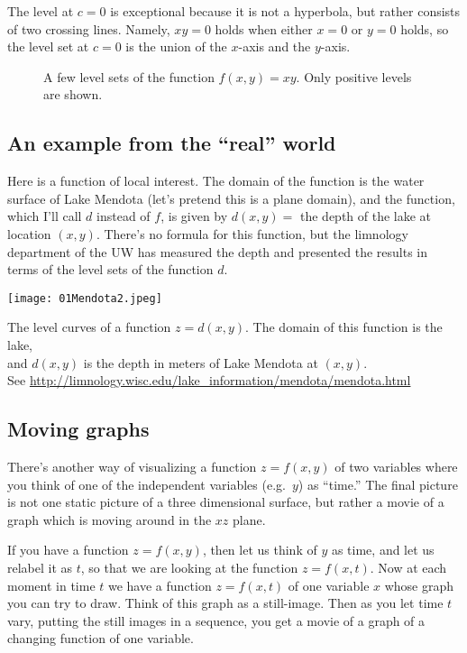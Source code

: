 The level at $c=0$ is exceptional because it is not a hyperbola, but
rather consists of two crossing lines.  Namely, $xy=0$ holds when
either $x=0$ or $y=0$ holds, so the level set at $c=0$ is the union of
the $x$-axis and the $y$-axis.

\begin{figure}[htb]
  \begin{center}
    
  \end{center}
  \caption{A few level sets of the function $f(x, y) = xy$.  Only
  positive levels are shown.  }
  \label{fig:saddlelevels}
\end{figure}


\subsection{An example from the ``real'' world} %
\label{sec:01mendotaexample}  Here is a function of local interest.
The domain of the function is the water surface of Lake Mendota (let's
pretend this is a plane domain), and the function, which I'll call $d$
instead of $f$, is given by $d(x, y) = $ the depth of the lake at
location $(x, y)$.  There's no formula for this function, but the
limnology department of the UW has measured the depth and presented
the results in terms of the level sets of the function $d$.


\begin{center}\sffamily
  \texttt{[image: 01Mendota2.jpeg]}

  The level curves of a function $z=d(x, y)$.  The domain
  of this function is the lake, \\
  and $d(x, y)$ is the depth in meters of Lake Mendota at $(x, y)$.\\
  See
  \url{http://limnology.wisc.edu/lake_information/mendota/mendota.html}
\end{center}


\subsection{Moving graphs} %
There's another way of visualizing a function $z=f(x, y)$ of two
variables where you think of one of the independent variables (e.g.\
$y$) as ``time.''  The final picture is not one static picture of a
three dimensional surface, but rather a movie of a graph which is
moving around in the $xz$ plane.

If you have a function $z=f(x, y)$, then let us think of $y$ as time,
and let us relabel it as $t$, so that we are looking at the function
$z=f(x,t)$. Now at each moment in time $t$ we have a function $z=f(x,t)$
of one variable $x$ whose graph you can try to draw. Think of this graph
as a still-image. Then as you let time $t$ vary, putting the still images
in a sequence, you get a movie of a graph of a changing function of one
variable.

